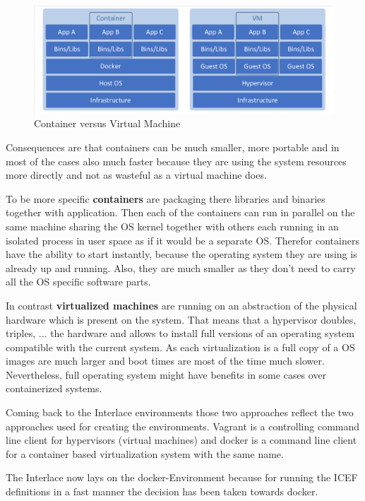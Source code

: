 \begin{figure}[htbp]
  \centering
  \includegraphics[width=1.0\textwidth, clip, trim=1mm 1mm 1mm 1mm]{Figures/container_vs_vm}
  \caption{Container versus Virtual Machine}
  \label{fig:docker-env-container-vs-vm}
\end{figure}

Consequences are that containers can be much smaller, more portable and in most of the cases also much faster because they are using the system resources more directly and not as wasteful as a virtual machine does.

To be more specific \textbf{containers} are packaging there libraries and binaries together with application. Then each of the containers can run in parallel on the same machine sharing the OS kernel together with others each running in an isolated process in user space as if it would be a separate OS. Therefor containers have the ability to start instantly, because the operating system they are using is already up and running. Also, they are much smaller as they don't need to carry all the OS specific software parts.

In contrast \textbf{virtualized machines} are running on an abstraction of the physical hardware which is present on the system. That means that a hypervisor doubles, triples, ... the hardware and allows to install full versions of an operating system compatible with the current system. As each virtualization is a full copy of a OS images are much larger and boot times are most of the time much slower. Nevertheless, full operating system might have benefits in some cases over containerized systems.

Coming back to the Interlace environments those two approaches reflect the two approaches used for creating the environments. Vagrant is a controlling command line client for hypervisors (virtual machines) and docker is a command line client for a container based virtualization system with the same name.

The Interlace now lays on the docker-Environment because for running the ICEF definitions in a fast manner the decision has been taken towards docker.
